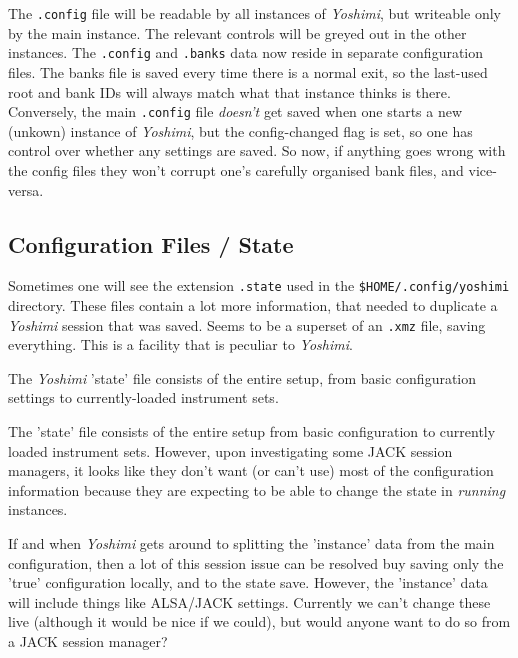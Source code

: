    The \texttt{.config} file will be readable by all instances of
   \textsl{Yoshimi}, but writeable only by the main instance. The relevant
   controls will be greyed out in the other instances.  The \texttt{.config} and
   \texttt{.banks} data now reside in separate configuration files.  The banks
   file is saved every time there is a normal exit, so the last-used root and
   bank IDs will always match what that instance thinks is there.  Conversely,
   the main \texttt{.config} file \textsl{doesn't} get saved when one starts a
   new (unkown) instance of \textsl{Yoshimi}, but the config-changed flag is
   set, so one has control over whether any settings are saved.  So now, if
   anything goes wrong with the config files they won't corrupt one's carefully
   organised bank files, and vice-versa.

\subsection{Configuration Files / State}
\label{subsec:configuration_state}

   Sometimes one will see the extension \texttt{.state} used in the
   \texttt{\$HOME/.config/yoshimi} directory.  These files contain a lot more
   information, that needed to duplicate a \textsl{Yoshimi} session that was
   saved.  Seems to be a superset of an \texttt{.xmz} file, saving everything.
   This is a facility that is peculiar to \textsl{Yoshimi}.

   The \textsl{Yoshimi} 'state' file consists of the entire setup, from basic
   configuration settings to currently-loaded instrument sets.

   The 'state' file consists of the entire setup from basic configuration to
   currently loaded instrument sets.  However, upon investigating some JACK
   session managers, it looks like they don't want (or can't use) most of the
   configuration information because they are expecting to be able to change
   the state in \textsl{running} instances.

   If and when \textsl{Yoshimi} gets around to splitting the 'instance' data
   from the main configuration, then a lot of this session issue can be resolved
   buy saving only the 'true' configuration locally, and to the state save.
   However, the 'instance' data will include things like ALSA/JACK settings.
   Currently we can't change these live (although it would be nice if we could),
   but would anyone want to do so from a JACK session manager?

